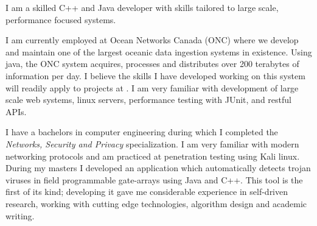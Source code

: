 I am a skilled C++ and Java developer with skills tailored to large scale, performance focused systems. 

I am currently employed at Ocean Networks Canada (ONC) where we develop and maintain one of the largest oceanic data ingestion systems in existence.
Using java, the ONC system acquires, processes and distributes over 200 terabytes of information per day.
I believe the skills I have developed working on this system will readily apply to projects at \company.
I am very familiar with development of large scale web systems, linux servers, performance testing with JUnit, and restful APIs.

I have a bachelors in computer engineering during which I completed the \textit{Networks, Security and Privacy} specialization.
I am very familiar with modern networking protocols and am practiced at penetration testing using Kali linux.
During my masters I developed an application which automatically detects trojan viruses in field programmable gate-arrays using Java and C++. 
This tool is the first of its kind; developing it gave me considerable experience in self-driven research, working with cutting edge technologies, algorithm design and academic writing. 
